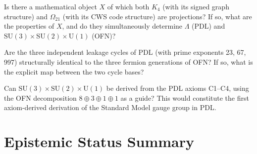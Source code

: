\documentclass[11pt,a4paper]{article}
\begin{document}
\begin{open_box}[title={OP-2: Identification of the common object $X$}]
Is there a mathematical object $X$ of which both $K_4$ (with its signed graph structure) and $\Omega_{21}$ (with its CWS code structure) are projections? If so, what are the properties of $X$, and do they simultaneously determine $\Lambda$ (PDL) and $\mathrm{SU}(3) \times \mathrm{SU}(2) \times \mathrm{U}(1)$ (OFN)?
\end{open_box}

\begin{open_box}[title={OP-3: Three leakage cycles and three fermion generations}]
Are the three independent leakage cycles of PDL (with prime exponents 23, 67, 997) structurally identical to the three fermion generations of OFN? If so, what is the explicit map between the two cycle bases?
\end{open_box}

\begin{open_box}[title={OP-4: Derivation of the Standard Model gauge group from C1--C4}]
Can $\mathrm{SU}(3) \times \mathrm{SU}(2) \times \mathrm{U}(1)$ be derived from the PDL axioms C1--C4, using the OFN decomposition $8 \oplus 3 \oplus 1 \oplus 1$ as a guide? This would constitute the first axiom-derived derivation of the Standard Model gauge group in PDL.
\end{open_box}

\section{Epistemic Status Summary}
\label{sec:epistemic}
\end{document}
